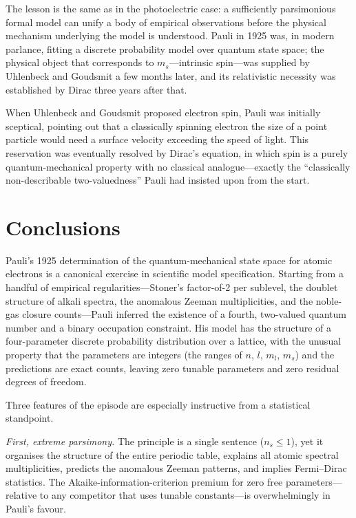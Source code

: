 \documentclass[12pt]{article}
\begin{document}
The lesson is the same as in the photoelectric case: a sufficiently parsimonious
formal model can unify a body of empirical observations before the physical
mechanism underlying the model is understood.  Pauli in 1925 was, in modern
parlance, fitting a discrete probability model over quantum state space; the
physical object that corresponds to $m_s$---intrinsic spin---was supplied by
Uhlenbeck and Goudsmit a few months later, and its relativistic necessity was
established by Dirac three years after that.

When Uhlenbeck and Goudsmit proposed electron spin, Pauli was initially
sceptical, pointing out that a classically spinning electron the size of a
point particle would need a surface velocity exceeding the speed of light.
This reservation was eventually resolved by Dirac's equation, in which spin
is a purely quantum-mechanical property with no classical analogue---exactly
the ``classically non-describable two-valuedness'' Pauli had insisted upon
from the start.

\section{Conclusions}
\label{sec:conclusions}

Pauli's 1925 determination of the quantum-mechanical state space for atomic
electrons is a canonical exercise in scientific model specification.  Starting
from a handful of empirical regularities---Stoner's factor-of-2 per sublevel,
the doublet structure of alkali spectra, the anomalous Zeeman multiplicities,
and the noble-gas closure counts---Pauli inferred the existence of a fourth,
two-valued quantum number and a binary occupation constraint.  His model has
the structure of a four-parameter discrete probability distribution over a
lattice, with the unusual property that the parameters are integers (the
ranges of $n$, $l$, $m_l$, $m_s$) and the predictions are exact counts,
leaving zero tunable parameters and zero residual degrees of freedom.

Three features of the episode are especially instructive from a statistical
standpoint.

\medskip
\emph{First, extreme parsimony.}  The principle is a single sentence
($n_s \leq 1$), yet it organises the structure of the entire periodic
table, explains all atomic spectral multiplicities, predicts the anomalous
Zeeman patterns, and implies Fermi--Dirac statistics.  The
Akaike-information-criterion premium for zero free parameters---relative
to any competitor that uses tunable constants---is overwhelmingly in Pauli's
favour.
\end{document}
